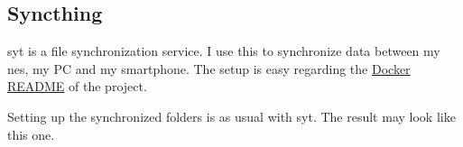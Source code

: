

\subsection{Syncthing}

\gls{syt} is a file synchronization service. I use this to synchronize data
between my \gls{nes}, my PC and my smartphone. The setup is easy regarding the
\href{https://github.com/syncthing/syncthing/blob/main/README-Docker.md}{Docker README}
of the project. 

Setting up the synchronized folders is as usual with \gls{syt}. The result
may look like this one.

